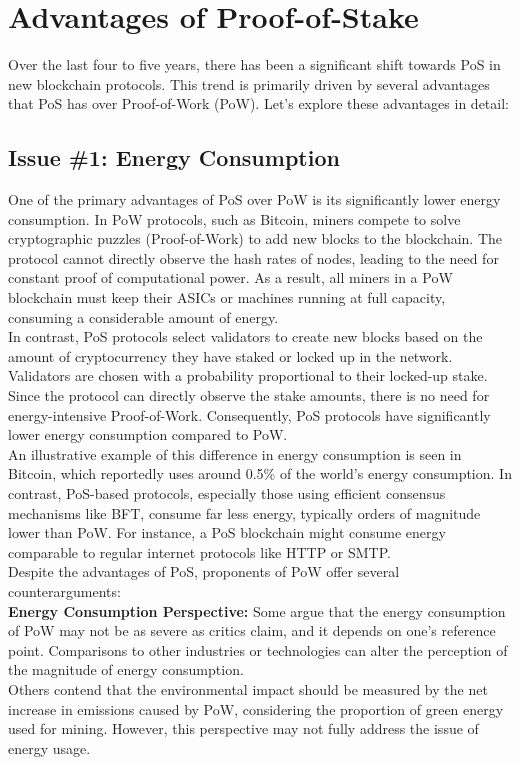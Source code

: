\section{Advantages of Proof-of-Stake}

Over the last four to five years, there has been a significant shift towards PoS in new blockchain protocols. This trend is primarily driven by several advantages that PoS has over Proof-of-Work (PoW). Let's explore these advantages in detail:

\subsection{Issue \#1: Energy Consumption}
One of the primary advantages of PoS over PoW is its significantly lower energy consumption. In PoW protocols, such as Bitcoin, miners compete to solve cryptographic puzzles (Proof-of-Work) to add new blocks to the blockchain. The protocol cannot directly observe the hash rates of nodes, leading to the need for constant proof of computational power. As a result, all miners in a PoW blockchain must keep their ASICs or machines running at full capacity, consuming a considerable amount of energy.\\
In contrast, PoS protocols select validators to create new blocks based on the amount of cryptocurrency they have staked or locked up in the network. Validators are chosen with a probability proportional to their locked-up stake. Since the protocol can directly observe the stake amounts, there is no need for energy-intensive Proof-of-Work. Consequently, PoS protocols have significantly lower energy consumption compared to PoW. \\

An illustrative example of this difference in energy consumption is seen in Bitcoin, which reportedly uses around 0.5\% of the world's energy consumption. In contrast, PoS-based protocols, especially those using efficient consensus mechanisms like BFT, consume far less energy, typically orders of magnitude lower than PoW. For instance, a PoS blockchain might consume energy comparable to regular internet protocols like HTTP or SMTP.\\
Despite the advantages of PoS, proponents of PoW offer several counterarguments:\\

\noindent
\textbf{Energy Consumption Perspective:} Some argue that the energy consumption of PoW may not be as severe as critics claim, and it depends on one's reference point. Comparisons to other industries or technologies can alter the perception of the magnitude of energy consumption.\\
Others contend that the environmental impact should be measured by the net increase in emissions caused by PoW, considering the proportion of green energy used for mining. However, this perspective may not fully address the issue of energy usage.\\

